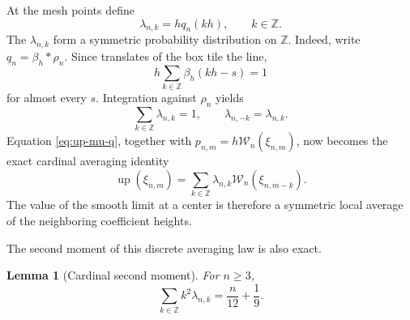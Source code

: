 \documentclass[11pt,oneside]{article}
\newtheorem{lemma}[theorem]{Lemma}
\theoremstyle{definition}
\theoremstyle{remark}
\newcommand{\Z}{\mathbb Z}
\newcommand{\Up}{\operatorname{up}}
\begin{document}
At the mesh points define
\begin{equation}
 \lambda_{n,k}=h q_n(kh),\qquad k\in\Z.                    \label{eq:lambda-def}
\end{equation}
The $\lambda_{n,k}$ form a symmetric probability distribution on $\Z$.
Indeed, write $q_n=\beta_h*\rho_n$.  Since translates of the box tile the line,
\begin{equation}
 h\sum_{k\in\Z}\beta_h(kh-s)=1                            \label{eq:box-partition}
\end{equation}
for almost every $s$.  Integration against $\rho_n$ yields
\begin{equation}
 \sum_{k\in\Z}\lambda_{n,k}=1,
 \qquad \lambda_{n,-k}=\lambda_{n,k}.                     \label{eq:lambda-probability}
\end{equation}
Equation \eqref{eq:up-mu-q}, together with
$p_{n,m}=h\mathcal W_n(\xi_{n,m})$, now becomes the exact cardinal averaging
identity
\begin{equation}
 \Up(\xi_{n,m})=
 \sum_{k\in\Z}\lambda_{n,k}
 \mathcal W_n(\xi_{n,m-k}).                               \label{eq:cardinal-average}
\end{equation}
The value of the smooth limit at a center is therefore a symmetric local average
of the neighboring coefficient heights.

The second moment of this discrete averaging law is also exact.

\begin{lemma}[Cardinal second moment]
\label{lem:cardinal-second-moment}
For $n\ge3$,
\begin{equation}
 \sum_{k\in\Z}k^2\lambda_{n,k}
 =\frac{n}{12}+\frac19.                                   \label{eq:lambda-second-moment}
\end{equation}
\end{lemma}
\end{document}
